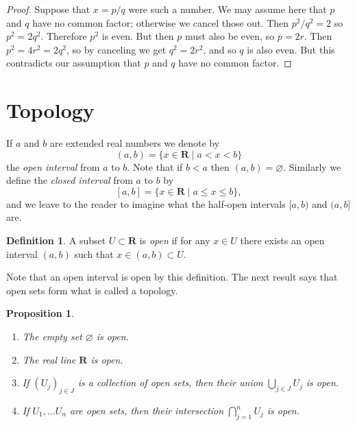\documentclass[11pt]{article}
\newtheorem{prop}[theo]{Proposition}
\theoremstyle{definition}
\newtheorem{defi}[theo]{Definition}
\def\empty{\varnothing}
\def\oint#1#2{(#1, #2)}
\def\cint#1#2{[#1, #2]}
\def\coint#1#2{[#1, #2)}
\def\ocint#1#2{(#1, #2]}
\def\RR{\mathbf{R}}
\begin{document}
\begin{proof}
Suppose that $x = p/q$ were such a number.
We may assume here that $p$ and $q$ have no common factor; otherwise we cancel
those out.
Then $p^2 / q^2 = 2$ so $p^2 = 2 q^2$.
Therefore $p^2$ is even.
But then $p$ must also be even, so $p = 2r$.
Then $p^2 = 4r^2 = 2q^2$, so by canceling we get $q^2 = 2 r^2$, and so $q$ is
also even.
But this contradicts our assumption that $p$ and $q$ have no common factor.
\end{proof}


\section{Topology}


If $a$ and $b$ are extended real numbers we denote by
\[
	\oint ab = \{ x \in \RR \mid a < x < b \}
\]
the \emph{open interval} from $a$ to $b$.
Note that if $b < a$ then $\oint ab = \empty$.
Similarly we define the \emph{closed interval} from $a$ to $b$ by
\[
	\cint ab = \{ x \in \RR \mid a \leq x \leq b \},
\]
and we leave to the reader to imagine what the half-open intervals $\coint ab$ and
$\ocint ab$ are.

\begin{defi}
A subset $U \subset \RR$ is \emph{open} if for any $x \in U$ there
exists an open interval $\oint ab$ such that $x \in \oint ab \subset U$.
\end{defi}

Note that an open interval is open by this definition.
The next result says that open sets form what is called a topology.

\begin{prop}
\begin{enumerate}
\item
The empty set $\empty$ is open.

\item
The real line $\RR$ is open.

\item
If $(U_j)_{j \in J}$ is a collection of open sets, then their union 
$\bigcup_{j \in J} U_j$ is open.

\item
If $U_1, \ldots U_n$ are open sets, then their intersection $\bigcap_{j=1}^n
U_j$ is open.
\end{enumerate}
\end{prop}
\end{document}
